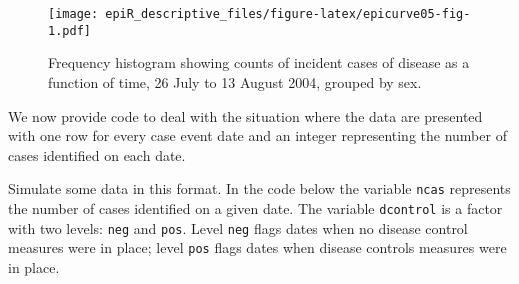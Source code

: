 \documentclass[
]{article}
\newenvironment{Shaded}{\begin{snugshade}}{\end{snugshade}}
\newcommand{\CommentTok}[1]{\textcolor[rgb]{0.56,0.35,0.01}{\textit{#1}}}
\newcommand{\DataTypeTok}[1]{\textcolor[rgb]{0.13,0.29,0.53}{#1}}
\newcommand{\DecValTok}[1]{\textcolor[rgb]{0.00,0.00,0.81}{#1}}
\newcommand{\KeywordTok}[1]{\textcolor[rgb]{0.13,0.29,0.53}{\textbf{#1}}}
\newcommand{\NormalTok}[1]{#1}
\newcommand{\OperatorTok}[1]{\textcolor[rgb]{0.81,0.36,0.00}{\textbf{#1}}}
\newcommand{\StringTok}[1]{\textcolor[rgb]{0.31,0.60,0.02}{#1}}
\begin{document}
\begin{figure}
\centering
\texttt{[image: epiR\_descriptive\_files/figure-latex/epicurve05-fig-1.pdf]}
\caption{\label{fig:epicurve05}Frequency histogram showing counts of
incident cases of disease as a function of time, 26 July to 13 August
2004, grouped by sex.}
\end{figure}

We now provide code to deal with the situation where the data are
presented with one row for every case event date and an integer
representing the number of cases identified on each date.

Simulate some data in this format. In the code below the variable
\texttt{ncas} represents the number of cases identified on a given date.
The variable \texttt{dcontrol} is a factor with two levels: \texttt{neg}
and \texttt{pos}. Level \texttt{neg} flags dates when no disease control
measures were in place; level \texttt{pos} flags dates when disease
controls measures were in place.

\begin{Shaded}
\end{Shaded}
\end{document}
